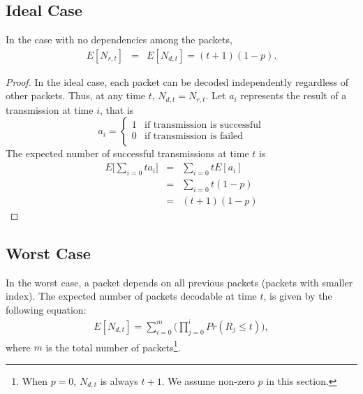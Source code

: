 \subsection{Ideal Case}
\begin{theorem}
\label{t:model:ideal}
    In the case with no dependencies among the packets,
    \begin{eqnarray*}
    E[N_{r,t}] &=& E[N_{d,t}] = (t+1)(1-p).
    \end{eqnarray*}
\end{theorem}
    \begin{proof}
    In the ideal case, each packet can be decoded independently
    regardless of other packets.  Thus, at any time $t$,
    $N_{d,t} = N_{r,t}$.
    Let $a_i$ represents the result of a transmission at time $i$,  
    that is
    \begin{displaymath}
    a_i = \left\{\begin{array}{ll}
    1 & \textrm{if transmission is successful}\\
    0 & \textrm{if transmission is failed}\\
    \end{array}\right.
    \end{displaymath}
    The expected number of successful transmissions at time $t$ is
    \begin{eqnarray*}
    E\big[\sum_{i=0}{t}a_i\big] &=& \sum_{i=0}{t}E[a_i]\\
                                &=& \sum_{i=0}{t}(1-p)\\
                                &=& (t+1)(1-p)
    \end{eqnarray*}
    \QED
    \end{proof}

\subsection{Worst Case}

    

    In the worst case, a packet depends on all previous packets (packets
    with smaller index).  The expected number of packets decodable at
    time $t$, is given by the following equation:
    \begin{eqnarray}
    \label{e:model:endt}
    E[N_{d,t}] = \sum_{i=0}^{m} \big(\prod_{j=0}^i Pr(R_j \le t)\big),
    \end{eqnarray}
    where $m$ is the total number of packets\footnote{When $p=0$, $N_{d,t}$ is always $t+1$.  We assume non-zero $p$ in this section.}.

